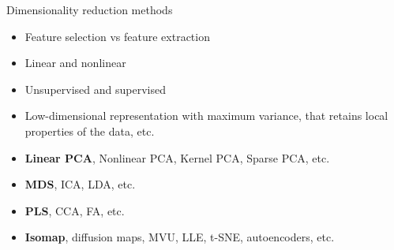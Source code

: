 \documentclass[14pt]{beamer}
\begin{document}
\begin{frame}{\large Dimensionality reduction methods}

\begin{itemize}
\item Feature selection vs feature extraction
\item Linear and nonlinear
\item Unsupervised and supervised
\item Low-dimensional representation with maximum variance, that retains local properties of the data, etc.
\item \textbf{Linear PCA}, Nonlinear PCA, Kernel PCA, Sparse PCA, etc.
\item \textbf{MDS}, ICA, LDA, etc.
\item \textbf{PLS}, CCA, FA, etc.
\item \textbf{Isomap}, diffusion maps, MVU, LLE, t-SNE, autoencoders, etc.
\end{itemize}
 

\end{frame}
\end{document}
